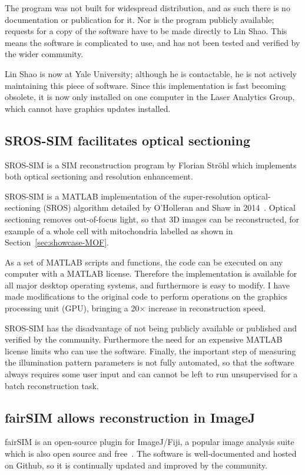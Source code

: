 The program was not built for widespread distribution, and as such there is no documentation or publication for it.
Nor is the program publicly available; requests for a copy of the software have to be made directly to Lin Shao.
This means the software is complicated to use, and has not been tested and verified by the wider community.

Lin Shao is now at Yale University; although he is contactable, he is not actively maintaining this piece of software.
Since this implementation is fast becoming obsolete, it is now only installed on one computer in the Laser Analytics Group, which cannot have graphics updates installed.

\subsection{SROS-SIM facilitates optical sectioning}
SROS-SIM is a SIM reconstruction program by Florian Str{\"o}hl which implements both optical sectioning and resolution enhancement.

SROS-SIM is a MATLAB implementation of the super-resolution optical-sectioning (SROS) algorithm detailed by O'Holleran and Shaw in 2014~\cite{oholleran2014optimized}.
Optical sectioning removes out-of-focus light, so that 3D images can be reconstructed, for example of a whole cell with mitochondria labelled as shown in Section~\ref{sec:showcase-MOF}.

As a set of MATLAB scripts and functions, the code can be executed on any computer with a MATLAB license.
Therefore the implementation is available for all major desktop operating systems, and furthermore is easy to modify.
I have made modifications to the original code to perform operations on the graphics processing unit (GPU), bringing a 20$\times$ increase in reconstruction speed.

SROS-SIM has the disadvantage of not being publicly available or published and verified by the community.
Furthermore the need for an expensive MATLAB license limits who can use the software.
Finally, the important step of measuring the illumination pattern parameters is not fully automated, so that the software always requires some user input and can cannot be left to run unsupervised for a batch reconstruction task.

\subsection{fairSIM allows reconstruction in ImageJ}
fairSIM is an open-source plugin for ImageJ/Fiji, a popular image analysis suite which is also open source and free~\cite{muller2016open, schindelin2012fiji}.
The software is well-documented and hosted on Github, so it is continually updated and improved by the community.

